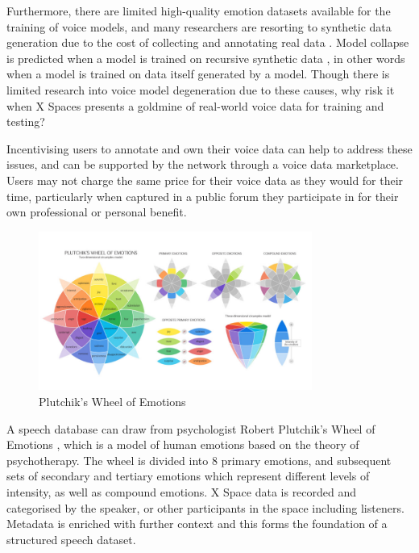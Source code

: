 \documentclass[11pt,a4paper]{article}
\begin{document}
Furthermore, there are limited high-quality emotion datasets available for the training of voice models, and many researchers are resorting to synthetic data generation due to the cost of collecting and annotating real data \cite{yang2025emovoice, wang2025speechdialoguefactory}.
Model collapse is predicted when a model is trained on recursive synthetic data \cite{shumailov2024model}, in other words when a model is trained on data itself generated by a model.
Though there is limited research into voice model degeneration due to these causes, why risk it when X Spaces presents a goldmine of real-world voice data for training and testing?

Incentivising users to annotate and own their voice data can help to address these issues, and can be supported by the network through a voice data marketplace.
Users may not charge the same price for their voice data as they would for their time, particularly when captured in a public forum they participate in for their own professional or personal benefit.

\begin{figure}[H]
    \centering
    \includegraphics[width=0.8\textwidth]{wheel.png}
    \caption{Plutchik's Wheel of Emotions}
    \label{fig:emotion-wheel-png}
\end{figure}

A speech database can draw from psychologist Robert Plutchik's Wheel of Emotions \cite{plutchik1980general}, which is a model of human emotions based on the theory of psychotherapy.
The wheel is divided into 8 primary emotions, and subsequent sets of secondary and tertiary emotions which represent different levels of intensity, as well as compound emotions.
X Space data is recorded and categorised by the speaker, or other participants in the space including listeners. Metadata is enriched with further context and this forms the foundation of a structured speech dataset.
\end{document}

